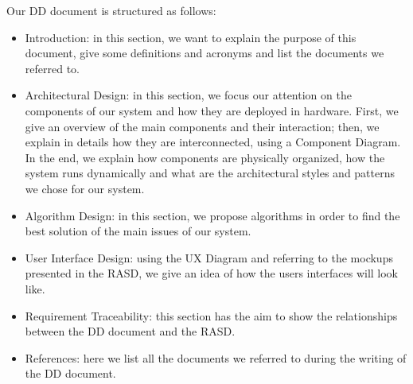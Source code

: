 Our DD document is structured as follows:
\begin{itemize}
    \item Introduction: in this section, we want to explain the purpose of this document, give some definitions and acronyms and list the documents we referred to. 
    \item Architectural Design: in this section, we focus our attention on the components of our system and how they are deployed in hardware. First, we give an overview of the main components and their interaction; then, we explain in details how they are interconnected, using a Component Diagram.
    In the end, we explain how components are physically organized, how the system runs dynamically and what are the architectural styles and patterns we chose for our system.
    \item Algorithm Design: in this section, we propose algorithms in order to find the best solution of the main issues of our system.
    \item User Interface Design: using the UX Diagram and referring to the mockups presented in the RASD, we give an idea of how the users interfaces will look like.
    \item Requirement Traceability: this section has the aim to show the relationships between the DD document and the RASD.
    \item References: here we list all the documents we referred to during the writing of the DD document.
\end{itemize}